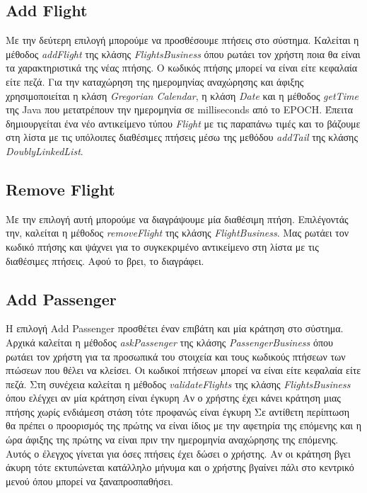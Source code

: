 \documentclass[a4paper]{article}
\begin{document}
\subsection{Add Flight}
Με την δεύτερη επιλογή μπορούμε να προσθέσουμε πτήσεις στο σύστημα. Καλείται η
μέθοδος \emph{addFlight} της κλάσης \emph{FlightsBusiness} όπου ρωτάει τον
χρήστη ποια θα είναι τα χαρακτηριστικά της νέας πτήσης. Ο κωδικός πτήσης μπορεί
να είναι είτε κεφαλαία είτε πεζά. Για την καταχώρηση της
ημερομηνίας αναχώρησης και άφιξης χρησιμοποιείται η κλάση \emph{Gregorian
Calendar}, η κλάση \emph{Date} και η μέθοδος \emph{getTime }της Java που 
μετατρέπουν την ημερομηνία σε milliseconds από το EPOCH. Έπειτα δημιουργείται
ένα νέο αντικείμενο τύπου \emph{Flight} με τις παραπάνω τιμές και το βάζουμε στη
λίστα με τις υπόλοιπες διαθέσιμες πτήσεις μέσω της μεθόδου \emph{addTail} της
κλάσης \emph{DoublyLinkedList}.

\subsection{Remove Flight}
Με την επιλογή αυτή μπορούμε να διαγράψουμε μία διαθέσιμη πτήση. Επιλέγοντάς
την, καλείται η μέθοδος \emph{removeFlight} της κλάσης \emph{FlightBusiness}.
Μας ρωτάει τον κωδικό πτήσης και ψάχνει για το συγκεκριμένο αντικείμενο στη
λίστα με τις διαθέσιμες πτήσεις. Αφού το βρει, το διαγράφει.

\subsection{Add Passenger}
Η επιλογή Add Passenger προσθέτει έναν επιβάτη και μία κράτηση στο σύστημα.
Αρχικά καλείται η μέθοδος \emph{askPassenger} της κλάσης
\emph{PassengerBusiness} όπου ρωτάει τον χρήστη για τα προσωπικά του στοιχεία
και τους κωδικούς πτήσεων των πτώσεων που θέλει να κλείσει. Οι κωδικοί πτήσεων 
μπορεί να είναι είτε κεφαλαία είτε πεζά. Στη συνέχεια καλείται
η μέθοδος \emph{validateFlights} της κλάσης \emph{FlightsBusiness} όπου
ελέγχει αν μία κράτηση είναι έγκυρη Αν ο χρήστης έχει κάνει κράτηση μιας πτήσης
χωρίς ενδιάμεση στάση τότε προφανώς είναι έγκυρη Σε αντίθετη περίπτωση θα
πρέπει ο προορισμός της πρώτης να είναι ίδιος με την αφετηρία της επόμενης και η
ώρα άφιξης της πρώτης να είναι πριν την ημερομηνία αναχώρησης της επόμενης.
Αυτός ο έλεγχος γίνεται για όσες πτήσεις έχει δώσει ο χρήστης. Αν οι κράτηση
βγει άκυρη τότε εκτυπώνεται κατάλληλο μήνυμα και ο χρήστης βγαίνει πάλι στο
κεντρικό μενού όπου μπορεί να ξαναπροσπαθήσει.
\end{document}
